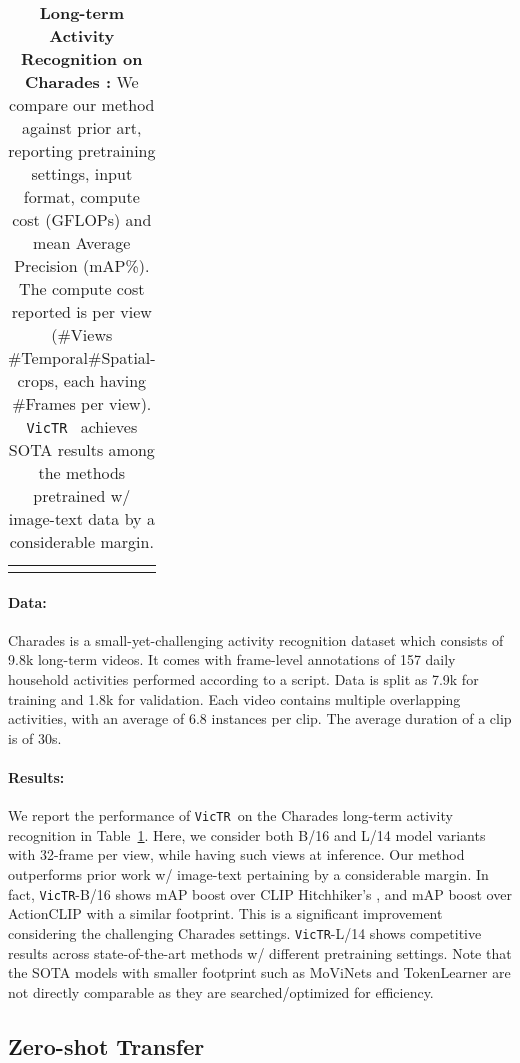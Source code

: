 \documentclass[10pt,twocolumn,letterpaper]{article}
\newcommand{\tref}[1]{Table~\ref{#1}}
\newcommand{\ours}{\texttt{VicTR}}
\begin{document}
\begin{table}[t!]
{\begin{tabular}{lccccr}
			\shline

	\end{tabular}}
	\caption{\textbf{Long-term Activity Recognition on Charades \cite{sigurdsson2016hollywood}:} We compare our method against prior art, reporting pretraining settings, input format, compute cost (GFLOPs) and mean Average Precision (mAP\%). The compute cost reported is per view (\#Views  \#Temporal\#Spatial-crops, each having \#Frames per view). \ours~ achieves SOTA results among the methods pretrained w/ image-text data by a considerable margin.}
    \vspace{-3mm}
	\label{tab:charades}
\end{table}

\paragraph{Data:} Charades \cite{sigurdsson2016hollywood} is a small-yet-challenging activity recognition dataset which consists of 9.8k long-term videos. It comes with frame-level annotations of 157 daily household activities performed according to a script. Data is split as 7.9k for training and 1.8k for validation. Each video contains multiple overlapping activities, with an average of 6.8 instances per clip. The average duration of a clip is of 30s.

\paragraph{Results:} We report the performance of \ours~on the Charades long-term activity recognition in \tref{tab:charades}. Here, we consider both B/16 and L/14 model variants with 32-frame per view, while having  such views at inference. Our method outperforms prior work w/ image-text pertaining by a considerable margin. In fact, \ours-B/16 shows  mAP boost over CLIP Hitchhiker's \cite{bain2022cliphitchhiker}, and  mAP boost over ActionCLIP \cite{wang2021actionclip} with a similar footprint. This is a significant improvement considering the challenging Charades settings. \ours-L/14 shows competitive results across state-of-the-art methods w/ different pretraining settings. Note that the SOTA models with smaller footprint such as MoViNets \cite{kondratyuk2021movinets} and TokenLearner \cite{ryoo2021tokenlearner} are not directly comparable as they are searched/optimized for efficiency.


\subsection{Zero-shot Transfer}
\end{document}
